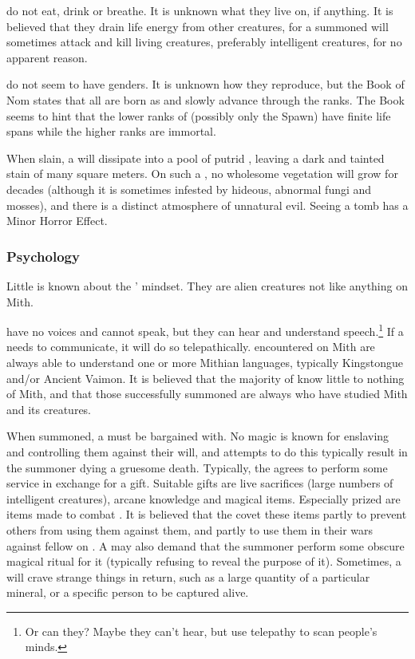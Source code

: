 \Banes{} do not eat, drink or breathe. It is unknown what they live on, if anything. It is believed that they drain life energy from other creatures, for a summoned \bane{} will sometimes attack and kill living creatures, preferably intelligent creatures, for no apparent reason. 

\Banes{} do not seem to have genders. It is unknown how they reproduce, but the Book of Nom states that all \banes{} are born as \banespawn{} and slowly advance through the ranks. The Book seems to hint that the lower ranks of \banes{} (possibly only the Spawn) have finite life spans while the higher ranks are immortal. 

When slain, a \bane{} will dissipate into a pool of putrid \baneblood, leaving a dark and tainted stain of many square meters. On such a \bane{} , no wholesome vegetation will grow for decades (although it is sometimes infested by hideous, abnormal fungi and mosses), and there is a distinct atmosphere of unnatural evil. Seeing a \bane{} tomb has a Minor Horror Effect. 

\subsubsection{Psychology}
Little is known about the \banes{}' mindset. They are alien creatures not like anything on Mith. 

\Banes{} have no voices and cannot speak, but they can hear and understand speech.\footnote{Or can they? Maybe they can't hear, but use telepathy to scan people's minds.} If a \bane{} needs to communicate, it will do so telepathically. \Banes{} encountered on Mith are always able to understand one or more Mithian languages, typically Kingstongue and/or Ancient Vaimon. It is believed that the majority of \banes{} know little to nothing of Mith, and that those successfully summoned are always  \banes{} who have studied Mith and its creatures. 

When summoned, a \bane{} must be bargained with. No magic is known for enslaving \banes{} and controlling them against their will, and attempts to do this typically result in the summoner dying a gruesome death. Typically, the \bane{} agrees to perform some service in exchange for a gift. Suitable gifts are live sacrifices (large numbers of intelligent creatures), arcane knowledge and magical items. Especially prized are items made to combat \banes{}. It is believed that the \banes{} covet these items partly to prevent others from using them against them, and partly to use them in their wars against fellow \banes{} on \Erebos. A \bane{} may also demand that the summoner perform some obscure magical ritual for it (typically refusing to reveal the purpose of it). Sometimes, a \bane{} will crave strange things in return, such as a large quantity of a particular mineral, or a specific person to be captured alive. 

